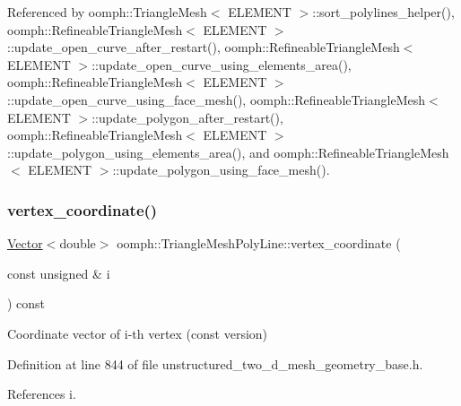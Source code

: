 Referenced by oomph\+::\+Triangle\+Mesh$<$ E\+L\+E\+M\+E\+N\+T $>$\+::sort\+\_\+polylines\+\_\+helper(), oomph\+::\+Refineable\+Triangle\+Mesh$<$ E\+L\+E\+M\+E\+N\+T $>$\+::update\+\_\+open\+\_\+curve\+\_\+after\+\_\+restart(), oomph\+::\+Refineable\+Triangle\+Mesh$<$ E\+L\+E\+M\+E\+N\+T $>$\+::update\+\_\+open\+\_\+curve\+\_\+using\+\_\+elements\+\_\+area(), oomph\+::\+Refineable\+Triangle\+Mesh$<$ E\+L\+E\+M\+E\+N\+T $>$\+::update\+\_\+open\+\_\+curve\+\_\+using\+\_\+face\+\_\+mesh(), oomph\+::\+Refineable\+Triangle\+Mesh$<$ E\+L\+E\+M\+E\+N\+T $>$\+::update\+\_\+polygon\+\_\+after\+\_\+restart(), oomph\+::\+Refineable\+Triangle\+Mesh$<$ E\+L\+E\+M\+E\+N\+T $>$\+::update\+\_\+polygon\+\_\+using\+\_\+elements\+\_\+area(), and oomph\+::\+Refineable\+Triangle\+Mesh$<$ E\+L\+E\+M\+E\+N\+T $>$\+::update\+\_\+polygon\+\_\+using\+\_\+face\+\_\+mesh().

\mbox{\label{classoomph_1_1TriangleMeshPolyLine_adae759da7a0165a00c7af92e36092dd6}} 
\subsubsection{\texorpdfstring{vertex\+\_\+coordinate()}{vertex\_coordinate()}\hspace{0.1cm}{\footnotesize\ttfamily [1/2]}}
{\footnotesize\ttfamily \hyperlink{classoomph_1_1Vector}{Vector}$<$double$>$ oomph\+::\+Triangle\+Mesh\+Poly\+Line\+::vertex\+\_\+coordinate (\begin{DoxyParamCaption}\item[{const unsigned \&}]{i }\end{DoxyParamCaption}) const\hspace{0.3cm}{\ttfamily [inline]}}



Coordinate vector of i-\/th vertex (const version) 



Definition at line 844 of file unstructured\+\_\+two\+\_\+d\+\_\+mesh\+\_\+geometry\+\_\+base.\+h.



References i.



